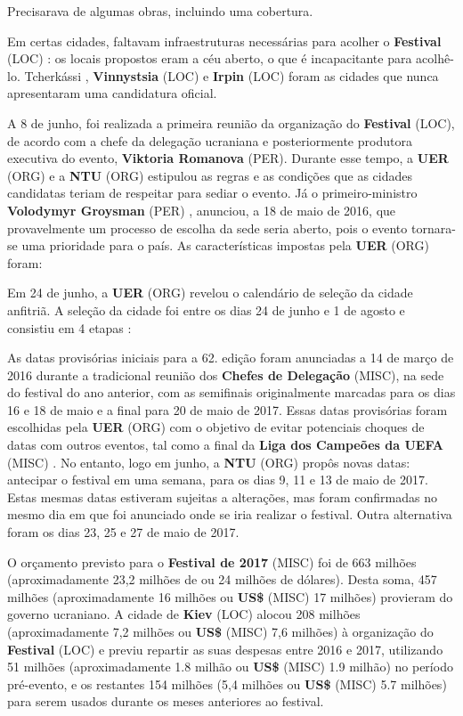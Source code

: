 \documentclass[12pt,a4paper]{article}
\begin{document}
Precisarava de algumas obras, incluindo uma cobertura.

Em certas cidades, faltavam infraestruturas necessárias para acolher o \textbf{Festival} (LOC) : os locais propostos eram a céu aberto, o que é incapacitante para acolhê-lo. Tcherkássi , \textbf{Vinnystsia} (LOC) e \textbf{Irpin} (LOC) foram as cidades que nunca apresentaram uma candidatura oficial.

A 8 de junho, foi realizada a primeira reunião da organização do \textbf{Festival} (LOC), de acordo com a chefe da delegação ucraniana e posteriormente produtora executiva do evento, \textbf{Viktoria Romanova} (PER). Durante esse tempo, a \textbf{UER} (ORG) e a \textbf{NTU} (ORG) estipulou as regras e as condições que as cidades candidatas teriam de respeitar para sediar o evento. Já o primeiro-ministro \textbf{Volodymyr Groysman} (PER) , anunciou, a 18 de maio de 2016, que provavelmente um processo de escolha da sede seria aberto, pois o evento tornara-se uma prioridade para o país. As características impostas pela \textbf{UER} (ORG) foram:

Em 24 de junho, a \textbf{UER} (ORG) revelou o calendário de seleção da cidade anfitriã. A seleção da cidade foi entre os dias 24 de junho e 1 de agosto e consistiu em 4 etapas :

As datas provisórias iniciais para a 62. edição foram anunciadas a 14 de março de 2016 durante a tradicional reunião dos \textbf{Chefes de Delegação} (MISC), na sede do festival do ano anterior, com as semifinais originalmente marcadas para os dias 16 e 18 de maio e a final para 20 de maio de 2017. Essas datas provisórias foram escolhidas pela \textbf{UER} (ORG) com o objetivo de evitar potenciais choques de datas com outros eventos, tal como a final da \textbf{Liga dos Campeões da UEFA} (MISC) . No entanto, logo em junho, a \textbf{NTU} (ORG) propôs novas datas: antecipar o festival em uma semana, para os dias 9, 11 e 13 de maio de 2017. Estas mesmas datas estiveram sujeitas a alterações, mas foram confirmadas no mesmo dia em que foi anunciado onde se iria realizar o festival. Outra alternativa foram os dias 23, 25 e 27 de maio de 2017.

O orçamento previsto para o \textbf{Festival de 2017} (MISC) foi de  663 milhões (aproximadamente 23,2 milhões de  ou 24 milhões de dólares). Desta soma,  457 milhões (aproximadamente 16 milhões  ou \textbf{US\$} (MISC) 17 milhões) provieram do governo ucraniano. A cidade de \textbf{Kiev} (LOC) alocou  208 milhões (aproximadamente 7,2 milhões  ou \textbf{US\$} (MISC) 7,6 milhões) à organização do \textbf{Festival} (LOC) e previu repartir as suas despesas entre 2016 e 2017, utilizando  51 milhões (aproximadamente 1.8 milhão  ou \textbf{US\$} (MISC) 1.9 milhão) no período pré-evento, e os restantes  154 milhões (5,4 milhões  ou \textbf{US\$} (MISC) 5.7 milhões) para serem usados durante os meses anteriores ao festival.
\end{document}
